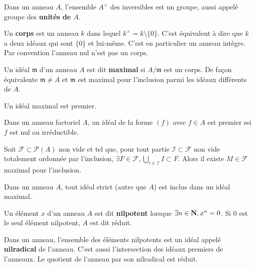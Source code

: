 	\begin{pop}
		Dans un anneau $A$, l'ensemble $A^\times$ des inversibles est un groupe, aussi appelé groupe des \textbf{unités de $A$}.
	\end{pop}
	
	\begin{defn}
		Un \textbf{corps} est un anneau $k$ dans lequel $k^\times = k \setminus \{ 0 \}$.
		C'est équivalent à dire que $k$ a deux idéaux qui sont $\{ 0 \}$ et lui-même.
		C'est en particulier un anneau intègre.
		Par convention l'anneau nul n'est pas un corps.
	\end{defn}

	\begin{defn}
		Un idéal $\mathfrak{m}$ d'un anneau $A$ est dit \textbf{maximal} si $A / \mathfrak{m}$ est un corps.
		De façon équivalente $\mathfrak{m} \neq A$ et $\mathfrak{m}$ est maximal pour l'inclusion parmi les idéaux différents de $A$.
	\end{defn}

	\begin{pop}
		Un idéal maximal est premier.
	\end{pop}

	\begin{ex}
		Dans un anneau factoriel $A$, un idéal de la forme $(f)$ avec $f \in A$ est premier ssi $f$ est nul ou irréductible.
	\end{ex}

	\begin{lem}
		Soit $\mathcal{F} \subset \mathcal{P}(A)$ non vide et tel que, pour tout partie $\mathcal{I} \subset \mathcal{F}$ non vide totalement ordonnée par l'inclusion, $\exists F \in \mathcal{F}, \bigcup_{i \in \mathcal{I}} I \subset F$.
		Alors il existe $M \in \mathcal{F}$ maximal pour l'inclusion.
	\end{lem}

	\begin{pop}
		Dans un anneau $A$, tout idéal strict (autre que $A$) est inclus dans un idéal maximal.
	\end{pop}
	
	\begin{defn}
		Un élément $x$ d'un anneau $A$ est dit \textbf{nilpotent} lorsque $\exists n \in \mathbf{N}, x^n = 0$.
		Si $0$ est le seul élément nilpotent, $A$ est dit réduit.
	\end{defn}
	
	\begin{pop}
		Dans un anneau, l'ensemble des éléments nilpotents est un idéal appelé \textbf{nilradical} de l'anneau.
		C'est aussi l'intersection des idéaux premiers de l'anneaux.
		Le quotient de l'anneau par son nilradical est réduit.
	\end{pop}
	
